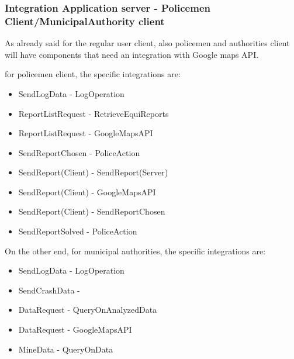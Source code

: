 \subsubsection{Integration Application server - Policemen Client/MunicipalAuthority client}
As already said for the regular user client, also policemen and authorities client will have components that need an integration with Google maps API. \\ \par
for policemen client, the specific integrations are:
\begin{itemize}
	\item SendLogData - LogOperation	
	\item ReportListRequest - RetrieveEquiReports
	\item ReportListRequest - GoogleMapsAPI
	\item SendReportChosen - PoliceAction
	\item SendReport(Client) - SendReport(Server)
	\item SendReport(Client) - GoogleMapsAPI
	\item SendReport(Client) - SendReportChosen
	\item SendReportSolved - PoliceAction
\end{itemize}
On the other end, for municipal authorities, the specific integrations are:
\begin{itemize}
	\item SendLogData - LogOperation
	\item SendCrashData - 	
	\item DataRequest - QueryOnAnalyzedData
	\item DataRequest - GoogleMapsAPI
	\item MineData - QueryOnData
\end{itemize}